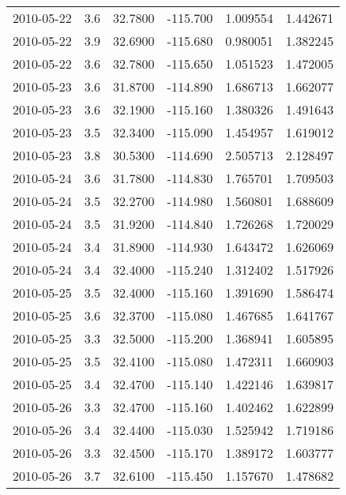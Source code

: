 \begin{tabular}{lrrrrr}
2010-05-22 &       3.6 &  32.7800 &  -115.700 &         1.009554 &         1.442671 \\
2010-05-22 &       3.9 &  32.6900 &  -115.680 &         0.980051 &         1.382245 \\
2010-05-22 &       3.6 &  32.7800 &  -115.650 &         1.051523 &         1.472005 \\
2010-05-23 &       3.6 &  31.8700 &  -114.890 &         1.686713 &         1.662077 \\
2010-05-23 &       3.6 &  32.1900 &  -115.160 &         1.380326 &         1.491643 \\
2010-05-23 &       3.5 &  32.3400 &  -115.090 &         1.454957 &         1.619012 \\
2010-05-23 &       3.8 &  30.5300 &  -114.690 &         2.505713 &         2.128497 \\
2010-05-24 &       3.6 &  31.7800 &  -114.830 &         1.765701 &         1.709503 \\
2010-05-24 &       3.5 &  32.2700 &  -114.980 &         1.560801 &         1.688609 \\
2010-05-24 &       3.5 &  31.9200 &  -114.840 &         1.726268 &         1.720029 \\
2010-05-24 &       3.4 &  31.8900 &  -114.930 &         1.643472 &         1.626069 \\
2010-05-24 &       3.4 &  32.4000 &  -115.240 &         1.312402 &         1.517926 \\
2010-05-25 &       3.5 &  32.4000 &  -115.160 &         1.391690 &         1.586474 \\
2010-05-25 &       3.6 &  32.3700 &  -115.080 &         1.467685 &         1.641767 \\
2010-05-25 &       3.3 &  32.5000 &  -115.200 &         1.368941 &         1.605895 \\
2010-05-25 &       3.5 &  32.4100 &  -115.080 &         1.472311 &         1.660903 \\
2010-05-25 &       3.4 &  32.4700 &  -115.140 &         1.422146 &         1.639817 \\
2010-05-26 &       3.3 &  32.4700 &  -115.160 &         1.402462 &         1.622899 \\
2010-05-26 &       3.4 &  32.4400 &  -115.030 &         1.525942 &         1.719186 \\
2010-05-26 &       3.3 &  32.4500 &  -115.170 &         1.389172 &         1.603777 \\
2010-05-26 &       3.7 &  32.6100 &  -115.450 &         1.157670 &         1.478682 \\

\end{tabular}

